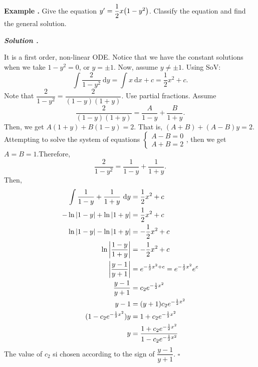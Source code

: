\documentclass[12pt, a4paper]{article}
\newcounter{index}[subsection]
\newenvironment*{eg}{\begin{framed}\par\noindent\textbf{Example \thesubsection.\stepcounter{index}\theindex}}{\par\end{framed}}
\newcounter{nprf}[subsection]
\newenvironment*{sol}{\par\indent\textbf{\textit{Solution \stepcounter{nprf}\thenprf.}}\par}{\hfill{$\square$}\par}
\def\d{{\mathrm{d}}}
\begin{document}
\begin{eg}
	Give the equation $y'=\dfrac{1}{2}x\qty(1-y^2)$. Classify the equation and find the general solution. 
	\begin{sol}
		It is a first order, non-linear ODE. Notice that we have the constant solutions when we take $1-y^2=0$, or $y=\pm1$. Now, assume $y\neq\pm1$. Using SoV: \[\int\dfrac{2}{1-y^2}\ \d{y}=\int x\ \d{x}+c=\dfrac{1}{2}x^2+c.\]	Note that $\dfrac{2}{1-y^2}=\dfrac{2}{(1-y)(1+y)}$. Use partial fractions. Assume \[\dfrac{2}{(1-y)(1+y)}=\dfrac{A}{1-y}+\dfrac{B}{1+y}.\] Then, we get $A(1+y)+B(1-y)=2$. That is, $(A+B)+(A-B)y=2$. Attempting to solve the system of equations $\begin{cases}A-B=0\\A+B=2\end{cases}$, then we get $A=B=1$.Therefore, \[\dfrac{2}{1-y^2}=\dfrac{1}{1-y}+\dfrac{1}{1+y}.\] Then, \[\begin{aligned}\int\dfrac{1}{1-y}+\dfrac{1}{1+y}\ \d{y}&=\dfrac{1}{2}x^2+c\\-\ln\qty|1-y|+\ln\qty|1+y|&=\dfrac{1}{2}x^2+c\\\ln\qty|1-y|-\ln\qty|1+y|&=-\dfrac{1}{2}x^2+c\\\ln\qty|\dfrac{1-y}{1+y}|&=-\dfrac{1}{2}x^2+c\\\qty|\dfrac{y-1}{y+1}|&=e^{-\frac{1}{2}x^2+c}=e^{-\frac{1}{2}x^2}e^c\\\dfrac{y-1}{y+1}&=c_2e^{-\frac{1}{2}x^2}\\y-1&=(y+1)c_2e^{-\frac{1}{2}x^2}\\(1-c_2e^{-\frac{1}{2}x^2})y&=1+c_2e^{-\frac{1}{2}x^2}\\y&=\dfrac{1+c_2e^{-\frac{1}{2}x^2}}{1-c_2e^{-\frac{1}{2}x^2}}\end{aligned}\] The value of $c_2$ si chosen according to the sign of $\dfrac{y-1}{y+1}.$
	\end{sol}
\end{eg}
\end{document}
